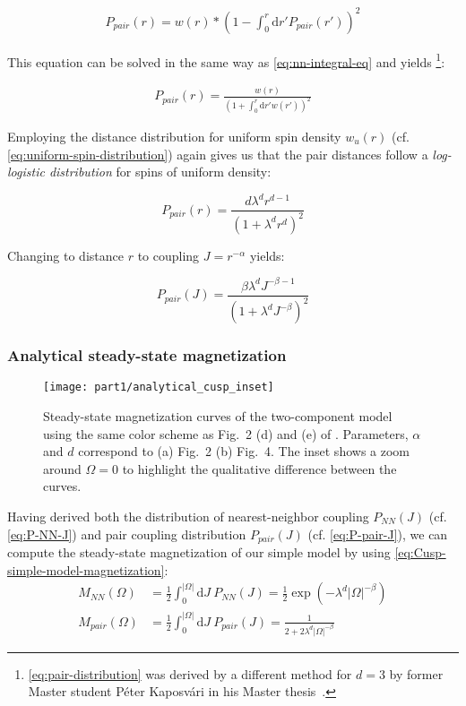 \begin{align}\label{eq:pair-integral-eq}
	P_{pair}(r) = w(r)*\left(1-\int_0^r \mathrm{d}r' P_{pair}(r')\right)^2
\end{align}

This equation can be solved in the same way as \autoref{eq:nn-integral-eq} and yields
\footnote{\autoref{eq:pair-distribution} was derived by a different method for $d=3$ by former Master student Péter Kaposvári in his Master thesis~\cite{peterMasterThesis}.}:

\begin{align}\label{eq:pair-distribution}
	P_{pair}(r) = \frac{w(r)}{\left(1+\int_0^r\!\mathrm{d}r' w(r')\right)^2}
\end{align}

Employing the distance distribution for uniform spin density $w_u(r)$ (cf. \autoref{eq:uniform-spin-distribution}) again gives us that the pair distances follow a \emph{log-logistic distribution} for spins of uniform density:

\begin{equation}\label{eq:log-logistic-distribution}
	P_{pair}(r) = \frac{d\lambda^d r^{d-1}}{\left(1 + \lambda^d r^d\right)^2 }
\end{equation}

Changing to distance $r$ to coupling $J=r^{-\alpha}$ yields:

\begin{equation}\label{eq:P-pair-J}
	P_{pair}(J) = \frac{\beta\lambda^d J^{-\beta-1}}{\left(1+\lambda^{d}J^{-\beta}\right)^2}
\end{equation}

\subsubsection{Analytical steady-state magnetization}

\begin{figure}[htb]
	\centering
	\texttt{[image: part1/analytical\_cusp\_inset]}
	\caption{Steady-state magnetization curves of the two-component model using the same color scheme as Fig.~2 (d) and (e) of \cite{franzEmergentPairLocalization2024}. Parameters, $\alpha$ and $d$ correspond to (a) Fig.~2 (b) Fig.~4.
	The inset shows a zoom around $\Omega=0$ to highlight the qualitative difference between the curves.
	}
	\label{fig:analytical-cusp}
\end{figure}

Having derived both the distribution of nearest-neighbor coupling $P_{NN}(J)$ (cf. \autoref{eq:P-NN-J}) and pair coupling distribution $P_{pair}(J)$ (cf. \autoref{eq:P-pair-J}), we can compute the steady-state magnetization of our simple model by using \autoref{eq:Cusp-simple-model-magnetization}:
\begin{align}
	M_{NN}(\Omega) &= \frac{1}{2}\int_0^{|\Omega|}\!\mathrm{d}J\ P_{NN}(J) = \frac{1}{2}\exp(-\lambda^d |\Omega|^{-\beta})\\
	M_{pair}(\Omega) &= \frac{1}{2}\int_0^{|\Omega|}\!\mathrm{d}J\ P_{pair}(J) = \frac{1}{2+2\lambda^{d}|\Omega|^{-\beta}}
\end{align}

